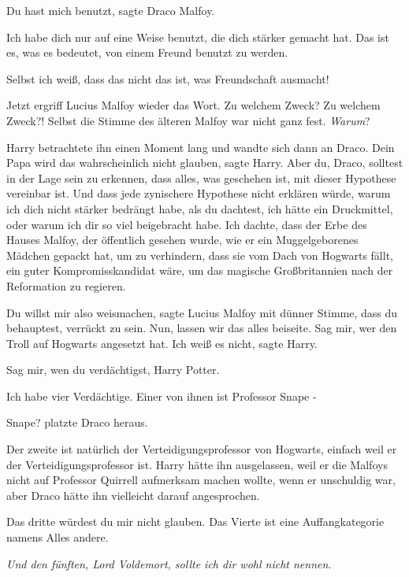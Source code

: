 \glqq{}Du hast mich benutzt\grqq{}, sagte Draco Malfoy.

\glqq{}Ich habe dich nur auf eine Weise benutzt, die dich stärker gemacht hat.
Das ist es, was es bedeutet, von einem Freund benutzt zu werden.\grqq{}

\glqq{}Selbst ich weiß, dass das nicht das ist, was Freundschaft ausmacht!\grqq{}

Jetzt ergriff Lucius Malfoy wieder das Wort. \glqq{}Zu welchem Zweck? Zu welchem
Zweck?!\grqq{} Selbst die Stimme des älteren Malfoy war nicht ganz fest. \glqq{}
\emph{Warum}?\grqq{}

Harry betrachtete ihn einen Moment lang und wandte sich dann an Draco. \glqq{}
Dein Papa wird das wahrscheinlich nicht glauben\grqq{}, sagte Harry. \glqq{}Aber
du, Draco, solltest in der Lage sein zu erkennen, dass alles, was geschehen ist,
mit dieser Hypothese vereinbar ist. Und dass jede zynischere Hypothese nicht
erklären würde, warum ich dich nicht stärker bedrängt habe, als du dachtest, ich
hätte ein Druckmittel, oder warum ich dir so viel beigebracht habe. Ich dachte,
dass der Erbe des Hauses Malfoy, der öffentlich gesehen wurde, wie er ein
Muggelgeborenes Mädchen gepackt hat, um zu verhindern, dass sie vom Dach von
Hogwarts fällt, ein guter Kompromisskandidat wäre, um das magische
Großbritannien nach der Reformation zu regieren.\grqq{}

\glqq{}Du willst mir also weismachen\grqq{}, sagte Lucius Malfoy mit dünner
Stimme, \glqq{}dass du behauptest, verrückt zu sein. Nun, lassen wir das alles
beiseite. Sag mir, wer den Troll auf Hogwarts angesetzt hat.\grqq{} \glqq{}Ich
weiß es nicht\grqq{}, sagte Harry.

\glqq{}Sag mir, wen du verdächtigst, Harry Potter.\grqq{}

\glqq{}Ich habe vier Verdächtige. Einer von ihnen ist Professor Snape -\grqq{}

\glqq{}Snape?\grqq{} platzte Draco heraus.

\glqq{}Der zweite ist natürlich der Verteidigungsprofessor von Hogwarts, einfach
weil er der Verteidigungsprofessor ist.\grqq{} Harry hätte ihn ausgelassen, weil
er die Malfoys nicht auf Professor Quirrell aufmerksam machen wollte, wenn er
unschuldig war, aber Draco hätte ihn vielleicht darauf angesprochen.

\glqq{}Das dritte würdest du mir nicht glauben. Das Vierte ist eine
Auffangkategorie namens Alles andere.\grqq{}

\emph{Und den fünften, Lord Voldemort, sollte ich dir wohl nicht nennen.}

